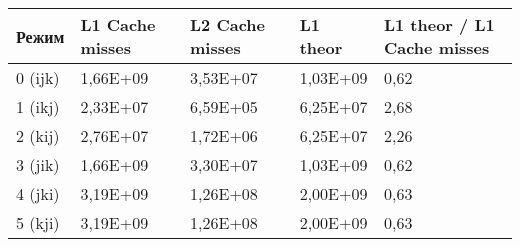 \documentclass[12pt,a4paper,oneside,final]{article}
\begin{document}
\begin{table}[h]
\begin{tabular}{|l|l|l|l|l|}
\hline
Режим   & L1 Cache misses & L2 Cache misses & L1 theor & L1 theor / L1 Cache misses \\ \hline
\rowcolor[HTML]{FFF2CC} 
0 (ijk) & 1,66E+09        & 3,53E+07        & 1,03E+09 & 0,62                       \\ \hline
\rowcolor[HTML]{E2EFDA} 
1 (ikj) & 2,33E+07        & 6,59E+05        & 6,25E+07 & 2,68                       \\ \hline
\rowcolor[HTML]{E2EFDA} 
2 (kij) & 2,76E+07        & 1,72E+06        & 6,25E+07 & 2,26                       \\ \hline
\rowcolor[HTML]{FFF2CC} 
3 (jik) & 1,66E+09        & 3,30E+07        & 1,03E+09 & 0,62                       \\ \hline
\rowcolor[HTML]{D9E1F2} 
4 (jki) & 3,19E+09        & 1,26E+08        & 2,00E+09 & 0,63                       \\ \hline
\rowcolor[HTML]{D9E1F2} 
5 (kji) & 3,19E+09        & 1,26E+08        & 2,00E+09 & 0,63                       \\ \hline
\end{tabular}
\end{table}
\end{document}
